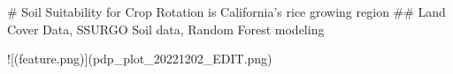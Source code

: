 # Soil Suitability for Crop Rotation is California's rice growing region  
## Land Cover Data, SSURGO Soil data, Random Forest modeling  




![(feature.png)](pdp_plot_20221202_EDIT.png)